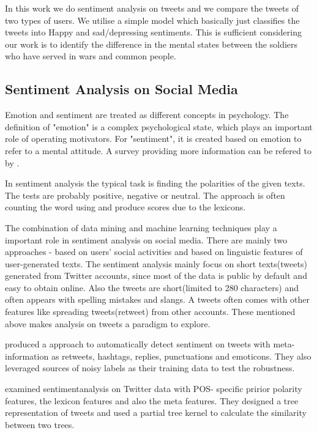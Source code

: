 In this work we do sentiment analysis on tweets and we compare the tweets of
two types of users. We utilise a simple model which basically just classifies
the tweets into Happy and sad/depressing sentiments. This is sufficient
considering our work is to identify the difference in the mental states between
the soldiers who have served in wars and common people.

\subsection{Sentiment Analysis on Social Media}

Emotion and sentiment are treated as different concepts in psychology. The
definition of "emotion" is a complex psychological state, which plays an
important role of operating motivators. For "sentiment", it is created based on
emotion to refer to a mental attitude. A survey providing more information can
be refered to by \cite{yue2018survey}.

In sentiment analysis the typical task is finding the polarities of the given
texts. The tests are probably positive, negative or neutral. The approach is
often counting the word using and produce scores due to the lexicons.

The combination of data mining and machine learning techniques play a important
role in sentiment analysis on social media. There are mainly two approaches -
based on users' social activities and based on linguistic features of
user-generated texts. The sentiment analysis mainly focus on short texts(tweets)
generated from Twitter accounts, since most of the data is public by default and
easy to obtain online. Also the tweets are short(limited to 280 characters) and
often appears with spelling mistakes and slangs. A tweets often comes with other
features like spreading tweets(retweet) from other accounts. These mentioned
above makes analysis on tweets a paradigm to explore.

\cite{robustTwitter2010Luciano} produced a approach to automatically detect
sentiment on tweets with meta-information as retweets, hashtags, replies,
punctuations and emoticons. They also leveraged sources of noisy
labels as their training data to test the robustness.

\cite{agarwal2011sentiment} examined sentimentanalysis on Twitter data with POS-
specific pririor polarity features, the lexicon features and also the meta
features. They designed a tree representation of tweets and used a partial tree
kernel to calculate the similarity between two trees.

